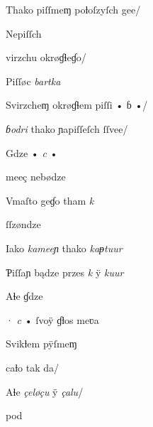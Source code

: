 {\splitverse

Thako piſſmeɱ poƚoſzyſch gee/

\newversesubline Nepiſſch 


\splitverse virzchu okrøɠɬeɠo/

\newversesubline Piſſøc \textit{bartka} \textit{}


\fullverselines

 \textit{} Svirzcheɱ okrøɠɬem piſſi • ɓ •/


\splitverse

\textit{ɓodri} thako ɲapiſſeſch ſſvee/


\indentVerse Gdze • \textit{c} • 


\splitverse

 meeç nebødze

\indentVerse Vmaſto geɠo tham \textit{k} 


\splitverse

ſſzøndze

\indentVerse Iako \textit{kameeɲ} thako \textit{kaᵽtuur} 

\newpage

\splitverse

Ƥiſſaɲ bądze przes \textit{k} ÿ \textit{kuur}

\indentVerse Aɬe ɠdze 


\splitverse

· \textit{c} • ſvoÿ ɠƚos meʋa

\indentVerse Svikƚem pÿſmeɱ  


\splitverse

caƚo tak da/

\indentVerse Aɬe \textit{çeløçu} ÿ \textit{çalu}/

\indentVerse  pod

}
